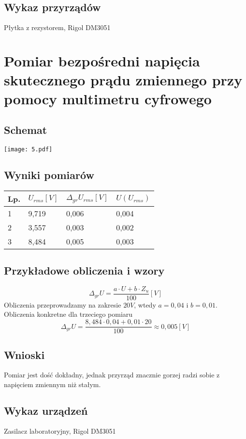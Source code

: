 \documentclass[11pt]{article}
\begin{document}
\subsection{Wykaz przyrządów}
Płytka z rezystorem, Rigol DM3051

\newpage
\section{Pomiar bezpośredni napięcia skutecznego prądu zmiennego przy pomocy multimetru cyfrowego}
\subsection{Schemat}
\begin{center}
\texttt{[image: 5.pdf]}
\end{center}
\subsection{Wyniki pomiarów}
\begin{center}
\begin{tabular}{|l|l|l|l|}
\hline
	Lp. & $U_{rms}[V]$ & $\Delta_{gr}U_{rms}[V]$ & $ U(U_{rms}) $\\
\hline
	1 & 9,719 & 0,006 & 0,004\\
\hline
	2 & 3,557 & 0,003 & 0,002\\
\hline
	3 & 8,484 & 0,005 & 0,003\\
\hline
\end{tabular}
\end{center}
\subsection{Przykładowe obliczenia i wzory}
$$ \Delta_{gr}U = \frac{a \cdot U + b \cdot Z_u}{100} [V] $$
Obliczenia przeprowadzamy na zakresie $20V$, wtedy $a = 0,04$ i $b = 0,01$. Obliczenia konkretne dla trzeciego pomiaru
$$ \Delta_{gr}U = \frac{8,484 \cdot 0,04 + 0,01 \cdot 20}{100} \approx 0,005 [V] $$

\subsection{Wnioski}
Pomiar jest dość dokładny, jednak przyrząd znacznie gorzej radzi sobie z napięciem zmiennym niż stałym.
\subsection{Wykaz urządzeń}
Zasilacz laboratoryjny, Rigol DM3051
\newpage
\end{document}
